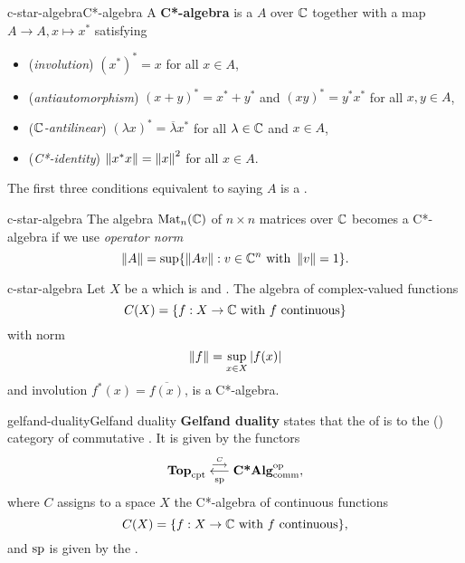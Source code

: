 \begin{topic}{c-star-algebra}{C*-algebra}
    A \textbf{C*-algebra} is a  $A$ over $\mathbb{C}$ together with a map $A \to A, x \mapsto x^*$ satisfying
    \begin{itemize}
        \item (\textit{involution}) $(x^*)^* = x$ for all $x \in A$,
        \item (\textit{antiautomorphism}) $(x + y)^* = x^* + y^*$ and $(xy)^* = y^* x^*$ for all $x, y \in A$,
        \item (\textit{$\mathbb{C}$-antilinear}) $(\lambda x)^* = \overline{\lambda} x^*$ for all $\lambda \in \mathbb{C}$ and $x \in A$,
        \item (\textit{C*-identity}) $\left\|x^* x\right\| = \left\|x\right\|^2$ for all $x \in A$.
    \end{itemize}
    The first three conditions equivalent to saying $A$ is a .
\end{topic}

\begin{example}{c-star-algebra}
    The algebra $\text{Mat}_n(\mathbb{C})$ of $n \times n$ matrices over $\mathbb{C}$ becomes a C*-algebra if we use \textit{operator norm}
    \[ \left\|A\right\| = \sup \{ \left\|A v\right\| : v \in \mathbb{C}^n \textup{ with } \left\|v\right\| = 1 \} . \]
\end{example}

\begin{example}{c-star-algebra}
    Let $X$ be a  which is  and . The algebra of complex-valued functions
    \[ C(X) = \{ f : X \to \mathbb{C} \textup{ with $f$ continuous} \} \]
    with norm
    \[ \left\|f\right\| = \sup_{x \in X} |f(x)| \]
    and involution $f^*(x) = \overline{f(x)}$, is a C*-algebra.
\end{example}

\begin{topic}{gelfand-duality}{Gelfand duality}
    \textbf{Gelfand duality} states that the  of    is  to the () category of commutative . It is given by the functors
    \[ \textbf{Top}_\textup{cpt} \stackrel{\overset{C}{\longrightarrow}}{\underset{\textup{sp}}{\longleftarrow}} \textbf{C*Alg}_\textup{comm}^\textup{op} , \]
    where $C$ assigns to a space $X$ the C*-algebra of continuous functions
    \[ C(X) = \{ f : X \to \mathbb{C} \textup{ with $f$ continuous} \} , \]
    and $\textup{sp}$ is given by the .
\end{topic}

